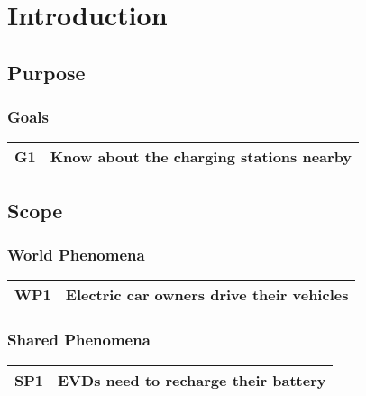 \documentclass{Configuration_Files/PoliMi3i_thesis}
\begin{document}
    \mainmatter %


    \chapter{Introduction}\label{ch:introduction}
    


    \section{Purpose}\label{sec:purpose}
    \subsection{Goals}
    \begin{tabular}{ |c|c| } 
    	\hline
    	G1 & Know about the charging stations nearby\\
    	\hline
    \end{tabular}


    \section{Scope}\label{sec:scope}
    \subsection{World Phenomena}
    \begin{tabular}{ |c|c| } 
    	\hline
    	WP1 & Electric car owners drive their vehicles\\
    	\hline
    \end{tabular}

    \subsection{Shared Phenomena}
	\begin{tabular}{ |c|c| } 
		\hline
		SP1 & EVDs need to recharge their battery\\
		\hline
	\end{tabular}
\end{document}
